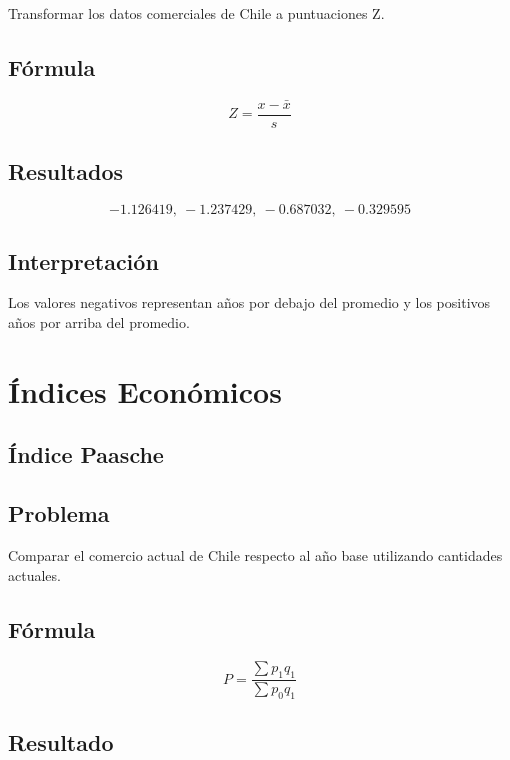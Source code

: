 \documentclass[12pt]{article}
\begin{document}
Transformar los datos comerciales de Chile a puntuaciones Z.

\subsection*{Fórmula}

\[
Z=\frac{x-\bar{x}}{s}
\]

\subsection*{Resultados}

\[
-1.126419,\ -1.237429,\ -0.687032,\ -0.329595
\]

\subsection*{Interpretación}

Los valores negativos representan años por debajo del promedio y los positivos años por arriba del promedio.


\section{Índices Económicos}


\subsection{Índice Paasche}

\subsection*{Problema}

Comparar el comercio actual de Chile respecto al año base utilizando cantidades actuales.

\subsection*{Fórmula}

\[
P=\frac{\sum p_1 q_1}{\sum p_0 q_1}
\]

\subsection*{Resultado}
\end{document}
